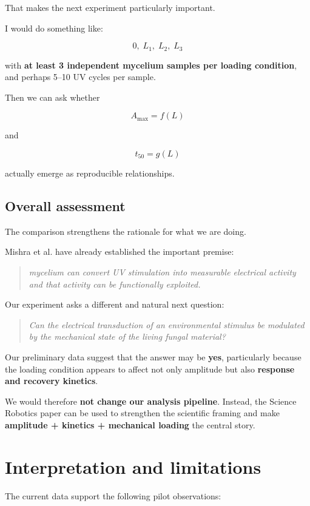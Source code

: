 \documentclass[11pt,a4paper]{article}
\begin{document}
That makes the next experiment particularly important.

I would do something like:

\[
0,\;L_1,\;L_2,\;L_3
\]

with \textbf{at least 3 independent mycelium samples per loading condition},
and perhaps 5--10 UV cycles per sample.

Then we can ask whether

\[
A_{\max}=f(L)
\]

and

\[
t_{50}=g(L)
\]

actually emerge as reproducible relationships.

\subsection{Overall assessment}

The comparison strengthens the rationale for what we are doing.

Mishra et al. have already established the important premise:

\begin{quote}
\emph{mycelium can convert UV stimulation into measurable electrical activity
and that activity can be functionally exploited.}
\end{quote}

Our experiment asks a different and natural next question:

\begin{quote}
\emph{Can the electrical transduction of an environmental stimulus be
modulated by the mechanical state of the living fungal material?}
\end{quote}

Our preliminary data suggest that the answer may be \textbf{yes}, particularly
because the loading condition appears to affect not only amplitude but also
\textbf{response and recovery kinetics}.

We would therefore \textbf{not change our analysis pipeline}. Instead, the
Science Robotics paper can be used to strengthen the scientific framing and
make \textbf{amplitude + kinetics + mechanical loading} the central story.

\section{Interpretation and limitations}

The current data support the following pilot observations:
\end{document}
